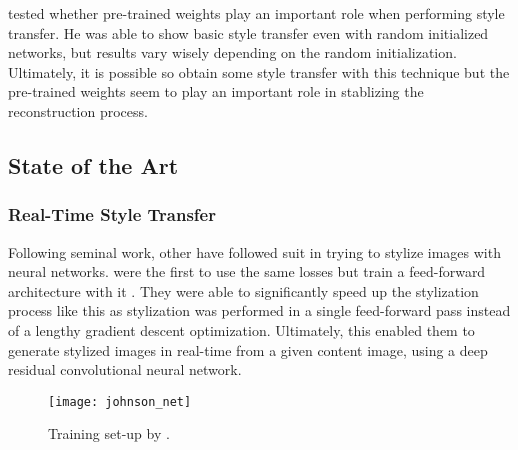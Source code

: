 \citeauthor*{LenDu} tested whether pre-trained weights play an important role when performing style transfer.
He was able to show basic style transfer even with random initialized networks, but results vary wisely depending on the random initialization.
Ultimately, it is possible so obtain some style transfer with this technique but the pre-trained weights seem to play an important role in stablizing the reconstruction process.

\subsection{State of the Art}

\subsubsection{Real-Time Style Transfer}
Following \citeauthor*{gatys} seminal work, other have followed suit in trying to stylize images with neural networks.
\citeauthor*{Johnson} were the first to use the same losses but train a feed-forward architecture with it \cite{johnson}.
They were able to significantly speed up the stylization process like this as stylization was performed in a single feed-forward pass instead of a lengthy gradient descent optimization.
Ultimately, this enabled them to generate stylized images in real-time from a given content image, using a deep residual convolutional neural network.
\begin{figure*}
    \texttt{[image: johnson\_net]}
    \caption[]{Training set-up by \citeauthor*{johnson}. \cite{johnson}}
\end{figure*}


